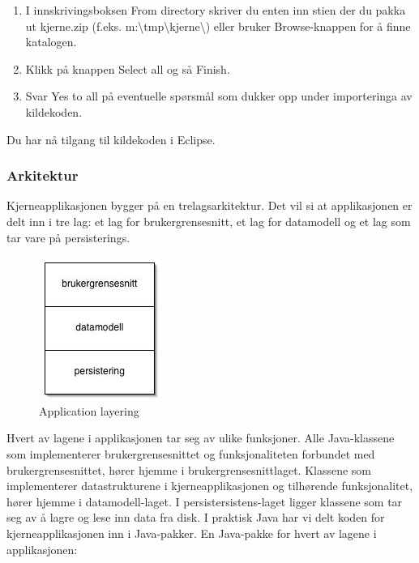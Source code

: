 \begin{enumerate}
\begin{enumerate}
\item
I innskrivingsboksen From directory skriver du enten inn stien der du pakka ut kjerne.zip (f.eks. m:\textbackslash tmp\textbackslash kjerne\textbackslash ) eller bruker Browse-knappen for å finne katalogen.

\item
Klikk på knappen Select all og så Finish.

\item
Svar Yes to all på eventuelle spørsmål som dukker opp under importeringa av kildekoden.

\end{enumerate}

\end{enumerate}

Du har nå tilgang til kildekoden i Eclipse.

\subsubsection{Arkitektur}

Kjerneapplikasjonen bygger på en trelagsarkitektur. Det vil si at applikasjonen er delt inn i tre lag: et lag for brukergrensesnitt, et lag for datamodell og et lag som tar vare på persisterings.

\begin{figure}[H]
    \centering
    \includegraphics[scale=0.8]{resources/layering-application.jpg}
    \caption{Application layering}
    \label{fig:layering-application}
\end{figure}

Hvert av lagene i applikasjonen tar seg av ulike funksjoner. Alle Java-klassene som implementerer brukergrensesnittet og funksjonaliteten forbundet med brukergrensesnittet, hører hjemme i brukergrensesnittlaget. Klassene som implementerer datastrukturene i kjerneapplikasjonen og tilhørende funksjonalitet, hører hjemme i datamodell-laget. I persistersistens-laget ligger klassene som tar seg av å lagre og lese inn data fra disk. I praktisk Java har vi delt koden for kjerneapplikasjonen inn i Java-pakker. En Java-pakke for hvert av lagene i applikasjonen:

